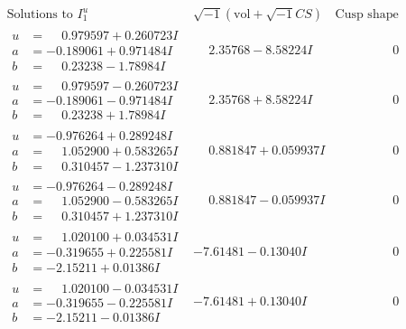 \documentclass[1p]{elsarticle_modified}
\theoremstyle{definition}
\newcommand{\I}{\sqrt{-1}}
\begin{document}
$$\begin{array}{c|c|c}  
\text{Solutions to }I^u_{1}& \I (\text{vol} + \sqrt{-1}CS) & \text{Cusp shape}\\
 \hline 
\begin{aligned}
u &= \phantom{-}0.979597 + 0.260723 I \\
a &= -0.189061 + 0.971484 I \\
b &= \phantom{-}0.23238 - 1.78984 I\end{aligned}
 & \phantom{-}2.35768 - 8.58224 I & \phantom{-0.000000 } 0 \\ \hline\begin{aligned}
u &= \phantom{-}0.979597 - 0.260723 I \\
a &= -0.189061 - 0.971484 I \\
b &= \phantom{-}0.23238 + 1.78984 I\end{aligned}
 & \phantom{-}2.35768 + 8.58224 I & \phantom{-0.000000 } 0 \\ \hline\begin{aligned}
u &= -0.976264 + 0.289248 I \\
a &= \phantom{-}1.052900 + 0.583265 I \\
b &= \phantom{-}0.310457 - 1.237310 I\end{aligned}
 & \phantom{-}0.881847 + 0.059937 I & \phantom{-0.000000 } 0 \\ \hline\begin{aligned}
u &= -0.976264 - 0.289248 I \\
a &= \phantom{-}1.052900 - 0.583265 I \\
b &= \phantom{-}0.310457 + 1.237310 I\end{aligned}
 & \phantom{-}0.881847 - 0.059937 I & \phantom{-0.000000 } 0 \\ \hline\begin{aligned}
u &= \phantom{-}1.020100 + 0.034531 I \\
a &= -0.319655 + 0.225581 I \\
b &= -2.15211 + 0.01386 I\end{aligned}
 & -7.61481 - 0.13040 I & \phantom{-0.000000 } 0 \\ \hline\begin{aligned}
u &= \phantom{-}1.020100 - 0.034531 I \\
a &= -0.319655 - 0.225581 I \\
b &= -2.15211 - 0.01386 I\end{aligned}
 & -7.61481 + 0.13040 I & \phantom{-0.000000 } 0 \\ \hline\begin{aligned}

\end{aligned}
\end{array}$$
\end{document}
